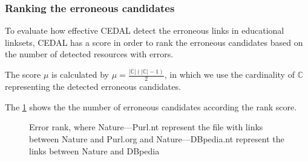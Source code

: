 \subsubsection{Ranking the erroneous candidates}
To evaluate how effective CEDAL detect the erroneous links in educational linksets, CEDAL has a score in order to rank the erroneous candidates based on the number of detected resources with errors.

The score $\mu$ is calculated by $\mu = \frac{|\mathbb{C}|(|\mathbb{C}| - 1)}{2}$, in which we use the cardinality of $\mathbb{C}$ representing the detected erroneous candidates. 

The \cref{fig:ErrorCounts} shows the the number of erroneous candidates according the rank score.

\newcommand{\slice}[4]{
  \pgfmathparse{0.5*#1+0.5*#2}
  \let\midangle\pgfmathresult

  \draw[thick,fill=black!10] (0,0) -- (#1:1) arc (#1:#2:1) -- cycle;

  \node[label=\midangle:#4] at (\midangle:1) {};

  \pgfmathparse{min((#2-#1-10)/110*(-0.3),0)}
  \let\temp\pgfmathresult
  \pgfmathparse{max(\temp,-0.5) + 0.8}
  \let\innerpos\pgfmathresult
  \node at (\midangle:\innerpos) {#3};
}

\begin{figure}[H]
	\centering
	{
		\label{fig:a1}
	}
	\caption{Error rank, where Nature---Purl.nt represent the file with links between Nature and Purl.org and Nature---DBpedia.nt represent the links between Nature and DBpedia}
	\label{fig:ErrorCounts}
\end{figure}



